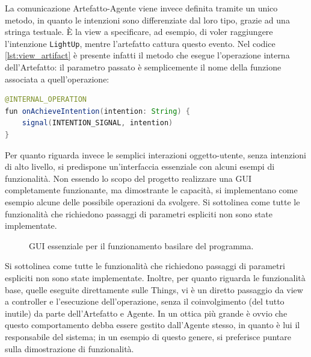 \documentclass[12pt,a4paper,openright,oneside]{report}
\begin{document}
La comunicazione Artefatto-Agente viene invece definita tramite un unico metodo, in quanto le intenzioni sono differenziate dal loro tipo, grazie ad una stringa testuale. È la view a specificare, ad esempio, di voler raggiungere l'intenzione \texttt{LightUp}, mentre l'artefatto cattura questo evento. Nel codice \ref{lst:view_artifact} è presente infatti il metodo che esegue l'operazione interna dell'Artefatto: il parametro passato è semplicemente il nome della funzione associata a quell'operazione:

\begin{lstlisting}[language=Java]
@INTERNAL_OPERATION
fun onAchieveIntention(intention: String) {
	signal(INTENTION_SIGNAL, intention)
}
\end{lstlisting}

Per quanto riguarda invece le semplici interazioni oggetto-utente, senza intenzioni di alto livello, si predispone un'interfaccia essenziale con alcuni esempi di funzionalità. Non essendo lo scopo del progetto realizzare una GUI completamente funzionante, ma dimostrante le capacità, si implementano come esempio alcune delle possibile operazioni da svolgere. Si sottolinea come tutte le funzionalità che richiedono passaggi di parametri espliciti non sono state implementate.

\begin{figure}[h]
	\centering
	\caption{GUI essenziale per il funzionamento basilare del programma.}
	\label{fig:gui_implementation}
\end{figure}

Si sottolinea come tutte le funzionalità che richiedono passaggi di parametri espliciti non sono state implementate. Inoltre, per quanto riguarda le funzionalità base, quelle eseguite direttamente sulle Things, vi è un diretto passaggio da view a controller e l'esecuzione dell'operazione, senza il coinvolgimento (del tutto inutile) da parte dell'Artefatto e Agente. In un ottica più grande è ovvio che questo comportamento debba essere gestito dall'Agente stesso, in quanto è lui il responsabile del sistema; in un esempio di questo genere, si preferisce puntare sulla dimostrazione di funzionalità.
\end{document}
